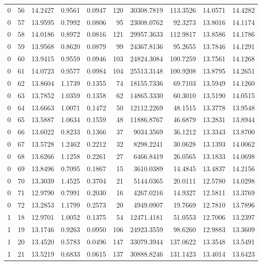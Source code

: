 \begin{longtable}{rrrrrrrrrr}
0 & 56 & 14.2427 & 0.9561 & 0.0947 & 120 & 30308.7819 & 113.3526 & 14.0571 & 14.4282 \\
0 & 57 & 13.9595 & 0.7992 & 0.0806 & 95 & 23008.0762 & 92.3273 & 13.8016 & 14.1174 \\
0 & 58 & 14.0186 & 0.8972 & 0.0816 & 121 & 29957.3633 & 112.9817 & 13.8586 & 14.1786 \\
0 & 59 & 13.9568 & 0.8620 & 0.0879 & 99 & 24367.8136 & 95.2655 & 13.7846 & 14.1291 \\
0 & 60 & 13.9415 & 0.9559 & 0.0946 & 103 & 24824.3084 & 100.7259 & 13.7561 & 14.1268 \\
0 & 61 & 14.0723 & 0.9577 & 0.0984 & 104 & 25513.3148 & 100.9208 & 13.8795 & 14.2651 \\
0 & 62 & 13.8604 & 1.1739 & 0.1355 & 74 & 18155.7336 & 69.7103 & 13.5949 & 14.1260 \\
0 & 63 & 13.7852 & 1.0359 & 0.1358 & 62 & 14865.3330 & 60.3010 & 13.5190 & 14.0515 \\
0 & 64 & 13.6663 & 1.0071 & 0.1472 & 50 & 12112.2269 & 48.1515 & 13.3778 & 13.9548 \\
0 & 65 & 13.5887 & 1.0634 & 0.1559 & 48 & 11886.8767 & 46.6879 & 13.2831 & 13.8944 \\
0 & 66 & 13.6022 & 0.8233 & 0.1366 & 37 & 9034.3569 & 36.1212 & 13.3343 & 13.8700 \\
0 & 67 & 13.5728 & 1.2462 & 0.2212 & 32 & 8298.2241 & 30.0628 & 13.1393 & 14.0062 \\
0 & 68 & 13.6266 & 1.1258 & 0.2261 & 27 & 6466.8419 & 26.0565 & 13.1833 & 14.0698 \\
0 & 69 & 13.8496 & 0.7095 & 0.1867 & 15 & 3610.0389 & 14.4845 & 13.4837 & 14.2156 \\
0 & 70 & 13.3039 & 1.4525 & 0.3704 & 21 & 5144.0365 & 20.0111 & 12.5780 & 14.0298 \\
0 & 71 & 12.9790 & 0.7991 & 0.2030 & 16 & 4267.0216 & 14.9327 & 12.5811 & 13.3769 \\
0 & 72 & 13.2853 & 1.1799 & 0.2573 & 20 & 4949.0907 & 19.7669 & 12.7810 & 13.7896 \\
1 & 18 & 12.9701 & 1.0052 & 0.1375 & 54 & 12471.4181 & 51.0553 & 12.7006 & 13.2397 \\
1 & 19 & 13.1746 & 0.9263 & 0.0950 & 106 & 24923.3559 & 98.6260 & 12.9883 & 13.3609 \\
1 & 20 & 13.4520 & 0.5783 & 0.0496 & 147 & 33079.3944 & 137.0622 & 13.3548 & 13.5491 \\
1 & 21 & 13.5219 & 0.6833 & 0.0615 & 137 & 30888.8246 & 131.1423 & 13.4014 & 13.6423 \\

\end{longtable}
